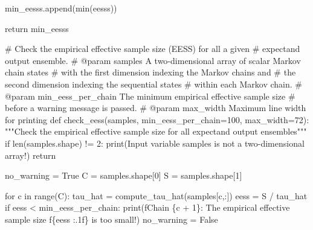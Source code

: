 \documentclass[
  letterpaper,
  DIV=11,
  numbers=noendperiod]{scrartcl}
\newenvironment{Shaded}{\begin{snugshade}}{\end{snugshade}}
\newcommand{\BuiltInTok}[1]{\textcolor[rgb]{0.00,0.23,0.31}{#1}}
\newcommand{\CommentTok}[1]{\textcolor[rgb]{0.37,0.37,0.37}{#1}}
\newcommand{\ControlFlowTok}[1]{\textcolor[rgb]{0.00,0.23,0.31}{#1}}
\newcommand{\DecValTok}[1]{\textcolor[rgb]{0.68,0.00,0.00}{#1}}
\newcommand{\KeywordTok}[1]{\textcolor[rgb]{0.00,0.23,0.31}{#1}}
\newcommand{\NormalTok}[1]{\textcolor[rgb]{0.00,0.23,0.31}{#1}}
\newcommand{\OperatorTok}[1]{\textcolor[rgb]{0.37,0.37,0.37}{#1}}
\newcommand{\SpecialCharTok}[1]{\textcolor[rgb]{0.37,0.37,0.37}{#1}}
\newcommand{\SpecialStringTok}[1]{\textcolor[rgb]{0.13,0.47,0.30}{#1}}
\newcommand{\StringTok}[1]{\textcolor[rgb]{0.13,0.47,0.30}{#1}}
\newcommand{\VariableTok}[1]{\textcolor[rgb]{0.07,0.07,0.07}{#1}}
\begin{document}
\begin{Shaded}
\begin{Highlighting}[]
\NormalTok{    min\_eesss.append(}\BuiltInTok{min}\NormalTok{(eesss))}
  
  \ControlFlowTok{return}\NormalTok{ min\_eesss}

\CommentTok{\# Check the empirical effective sample size (EESS) for all a given }
\CommentTok{\# expectand output ensemble.}
\CommentTok{\# @param samples A two{-}dimensional array of scalar Markov chain states }
\CommentTok{\#                with the first dimension indexing the Markov chains and }
\CommentTok{\#                the second dimension indexing the sequential states }
\CommentTok{\#                within each Markov chain.}
\CommentTok{\# @param min\_eess\_per\_chain The minimum empirical effective sample size}
\CommentTok{\#                           before a warning message is passed.}
\CommentTok{\# @param max\_width Maximum line width for printing}
\KeywordTok{def}\NormalTok{ check\_eess(samples, min\_eess\_per\_chain}\OperatorTok{=}\DecValTok{100}\NormalTok{, max\_width}\OperatorTok{=}\DecValTok{72}\NormalTok{):}
  \CommentTok{"""Check the empirical effective sample size for all expectand }
\CommentTok{     output ensembles"""}
  \ControlFlowTok{if} \BuiltInTok{len}\NormalTok{(samples.shape) }\OperatorTok{!=} \DecValTok{2}\NormalTok{:}
    \BuiltInTok{print}\NormalTok{(}\StringTok{\textquotesingle{}Input variable \textasciigrave{}samples\textasciigrave{} is not a two{-}dimensional array!\textquotesingle{}}\NormalTok{)}
    \ControlFlowTok{return}
  
\NormalTok{  no\_warning }\OperatorTok{=} \VariableTok{True}
\NormalTok{  C }\OperatorTok{=}\NormalTok{ samples.shape[}\DecValTok{0}\NormalTok{]}
\NormalTok{  S }\OperatorTok{=}\NormalTok{ samples.shape[}\DecValTok{1}\NormalTok{]}
  
  \ControlFlowTok{for}\NormalTok{ c }\KeywordTok{in} \BuiltInTok{range}\NormalTok{(C):}
\NormalTok{    tau\_hat }\OperatorTok{=}\NormalTok{ compute\_tau\_hat(samples[c,:])}
\NormalTok{    eess }\OperatorTok{=}\NormalTok{ S }\OperatorTok{/}\NormalTok{ tau\_hat}
    \ControlFlowTok{if}\NormalTok{ eess }\OperatorTok{\textless{}}\NormalTok{ min\_eess\_per\_chain:}
      \BuiltInTok{print}\NormalTok{(}\SpecialStringTok{f\textquotesingle{}Chain }\SpecialCharTok{\{}\NormalTok{c }\OperatorTok{+} \DecValTok{1}\SpecialCharTok{\}}\SpecialStringTok{: The empirical effective sample size \textquotesingle{}}
            \SpecialStringTok{f\textquotesingle{}}\SpecialCharTok{\{}\NormalTok{eess }\SpecialCharTok{:.1f\}}\SpecialStringTok{ is too small!\textquotesingle{}}\NormalTok{)}
\NormalTok{      no\_warning }\OperatorTok{=} \VariableTok{False}
  

\end{Highlighting}
\end{Shaded}
\end{document}
